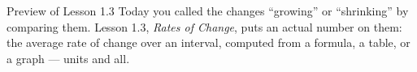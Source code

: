 \documentclass[10pt]{article}
\begin{document}
\vspace{0.1in}

\boxguard
\begin{notesbox}{Preview of Lesson 1.3}
Today you called the changes ``growing'' or ``shrinking'' by comparing them.
Lesson 1.3, \textit{Rates of Change}, puts an actual number on them: the
average rate of change over an interval, computed from a formula, a table, or
a graph --- units and all.
\end{notesbox}
\end{document}
